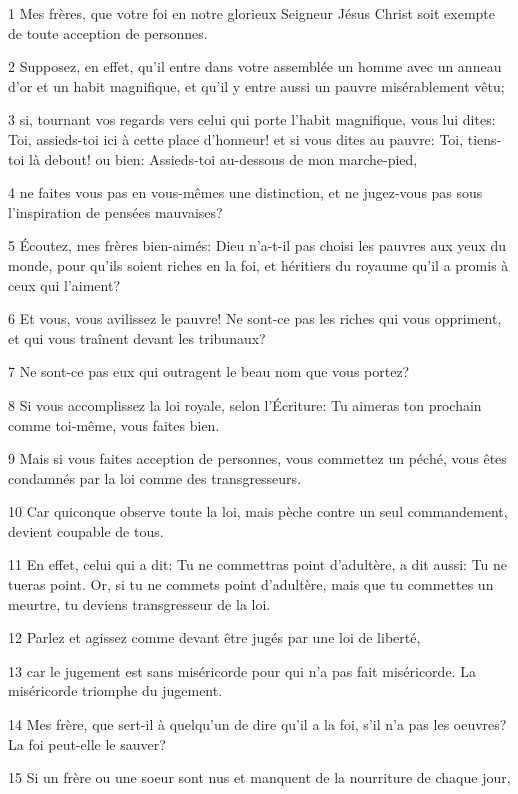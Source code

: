 \par 1 Mes frères, que votre foi en notre glorieux Seigneur Jésus Christ soit exempte de toute acception de personnes.
\par 2 Supposez, en effet, qu'il entre dans votre assemblée un homme avec un anneau d'or et un habit magnifique, et qu'il y entre aussi un pauvre misérablement vêtu;
\par 3 si, tournant vos regards vers celui qui porte l'habit magnifique, vous lui dites: Toi, assieds-toi ici à cette place d'honneur! et si vous dites au pauvre: Toi, tiens-toi là debout! ou bien: Assieds-toi au-dessous de mon marche-pied,
\par 4 ne faites vous pas en vous-mêmes une distinction, et ne jugez-vous pas sous l'inspiration de pensées mauvaises?
\par 5 Écoutez, mes frères bien-aimés: Dieu n'a-t-il pas choisi les pauvres aux yeux du monde, pour qu'ils soient riches en la foi, et héritiers du royaume qu'il a promis à ceux qui l'aiment?
\par 6 Et vous, vous avilissez le pauvre! Ne sont-ce pas les riches qui vous oppriment, et qui vous traînent devant les tribunaux?
\par 7 Ne sont-ce pas eux qui outragent le beau nom que vous portez?
\par 8 Si vous accomplissez la loi royale, selon l'Écriture: Tu aimeras ton prochain comme toi-même, vous faites bien.
\par 9 Mais si vous faites acception de personnes, vous commettez un péché, vous êtes condamnés par la loi comme des transgresseurs.
\par 10 Car quiconque observe toute la loi, mais pèche contre un seul commandement, devient coupable de tous.
\par 11 En effet, celui qui a dit: Tu ne commettras point d'adultère, a dit aussi: Tu ne tueras point. Or, si tu ne commets point d'adultère, mais que tu commettes un meurtre, tu deviens transgresseur de la loi.
\par 12 Parlez et agissez comme devant être jugés par une loi de liberté,
\par 13 car le jugement est sans miséricorde pour qui n'a pas fait miséricorde. La miséricorde triomphe du jugement.
\par 14 Mes frère, que sert-il à quelqu'un de dire qu'il a la foi, s'il n'a pas les oeuvres? La foi peut-elle le sauver?
\par 15 Si un frère ou une soeur sont nus et manquent de la nourriture de chaque jour,
